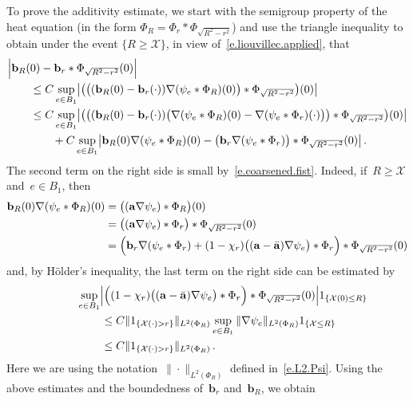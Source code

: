 \documentclass[11pt]{article} %
\numberwithin{equation}{section}
\theoremstyle{definition}
\renewcommand{\b}{\ensuremath{\mathbf{b}}}
\renewcommand{\a}{\mathbf{a}}
\newcommand{\ahom}{\bar{\a}}
\newcommand{\X}{\mathcal{X}}
\newcommand{\indc}{1}
\newcommand{\minscale}{\chi}
\begin{document}
To prove the additivity estimate, we start with the semigroup property of the heat equation (in the form $\Phi_R = \Phi_r \ast \Phi_{\sqrt{R^2-r^2}}$) and use the triangle inequality to obtain under the event $\{R \geq \X\}$, in view of~\eqref{e.liouvillec.applied}, that 
\begin{align*}
\lefteqn{
\Bigl| 
 \b_R(0) - \b_r \ast \Phi_{\sqrt{R^2-r^2}} (0)
\Bigr|
} 
\qquad & 
\\ &
\leq
C \sup_{e \in B_1} \bigl|
\bigl( \bigl( ( \b_R(0) - \b_r(\cdot) ) \nabla ( \psi_e \ast \Phi_{R}) (0) \bigr)
\ast \Phi_{\sqrt{R^2-r^2}} \bigr) (0) \bigr|
\\ & 
\leq
C \sup_{e \in B_1} \bigl| \bigl( \bigl(
( \b_R (0) - \b_r (\cdot) )\bigl( \nabla ( \psi_e \ast \Phi_{R})(0) - \nabla ( \psi_e \ast \Phi_{r}) (\cdot)  \bigr) \bigr)
\ast \Phi_{\sqrt{R^2-r^2}} \bigr)(0) \bigr| 
\\ & \qquad 
+ C \sup_{e \in B_1} \bigl| \b_R(0) \nabla( \psi_e \ast \Phi_R)(0)-   \bigl( \b_r \nabla ( \psi_e \ast \Phi_{r}) \bigr) \ast\Phi_{\sqrt{R^2-r^2}}(0)
 \bigr| 
\,.
\end{align*}
The second term on the right side is small by~\eqref{e.coarsened.fist}. Indeed, if~$R \geq  \X$ and~$e \in B_1$, then
\begin{align} \notag
\b_R (0) \nabla ( \psi_e \ast \Phi_R) (0) 
&
=
\bigl( (\a\nabla \psi_e)\ast \Phi_R \bigr)(0)
\\ \notag & 
=
\bigl( 
(\a\nabla \psi_e)\ast \Phi_r 
\bigr) \ast\Phi_{\sqrt{R^2-r^2}} (0)
\\  &  
=
\Bigl( \b_r \nabla(  \psi_e \ast \Phi_r )   + (1-\minscale_{r} ) \bigl((\a - \ahom)\nabla \psi_e \bigr)\ast \Phi_r \Bigr) \ast\Phi_{\sqrt{R^2-r^2}}(0)
\label{e.semigroup.identity}
\end{align}
and, by H\"older's inequality, the last term on the right side can be estimated by
\begin{align} \notag  
\lefteqn{
\sup_{e\in B_1} \Bigl|
\Bigl( 
(1-\minscale_{r} ) \bigl((\a - \ahom)\nabla \psi_e \bigr)\ast \Phi_r \Bigr) \ast\Phi_{\sqrt{R^2-r^2}}(0)
\Bigr| \indc_{\{\X(0) \leq R \}}
} \qquad &
\\ 
\notag &
\leq C \| \indc_{\{\X(\cdot)>r\}} \|_{L^2(\Phi_{R})} 
\sup_{e\in B_1} 
\| \nabla \psi_e \|_{L^2(\Phi_{R})} \indc_{\{\X \leq R \}}
\\ \notag & 
\leq 
C \| \indc_{\{\X(\cdot)>r\}} \|_{L^2(\Phi_{R})} 
\,.
\end{align}
Here we are using the notation~$\| \cdot \|_{L^2(\Phi_R)}$ defined in~\eqref{e.L2.Psi}.
Using the above estimates and the boundedness of~$\b_r$ and~$\b_R$, we obtain
\end{document}
